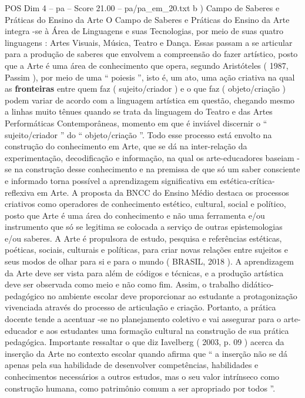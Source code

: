 \begin{textsample}{POS Dim 4 – pa – Score 21.00 – pa/pa\_em\_20.txt}  \label{ex:f4_pos_002}
b ) Campo de Saberes e Práticas do Ensino da Arte O Campo de Saberes e Práticas do Ensino da Arte integra -se à Área de Linguagens e suas Tecnologias, por meio de suas quatro linguagens : Artes Visuais, Música, Teatro e Dança.
Essas passam a se articular para a produção de saberes que envolvem a compreensão do fazer artístico, posto que a Arte é uma área de conhecimento que opera, segundo Aristóteles ( 1987, Passim ), por meio de uma “ poiesis ”, isto é, um ato, uma ação criativa na qual as \textbf{fronteiras} entre quem faz ( sujeito/criador ) e o que faz ( objeto/criação ) podem variar de acordo com a linguagem artística em questão, chegando mesmo a linhas muito tênues quando se trata da linguagem do Teatro e das Artes Performáticas Contemporâneas, momento em que é inviável discernir o “ sujeito/criador ” do “ objeto/criação ”.
Todo esse processo está envolto na construção do conhecimento em Arte, que se dá na inter-relação da experimentação, decodificação e informação, na qual os arte-educadores baseiam -se na construção desse conhecimento e na premissa de que só um saber consciente e informado torna possível a aprendizagem significativa em estética-crítica-reflexiva em Arte.
A proposta da BNCC do Ensino Médio destaca os processos criativos como operadores de conhecimento estético, cultural, social e político, posto que Arte é uma área do conhecimento e não uma ferramenta e/ou instrumento que só se legitima se colocada a serviço de outras epistemologias e/ou saberes.
A Arte é propulsora de estudo, pesquisa e referências estéticas, poéticas, sociais, culturais e políticas, para criar novas relações entre sujeitos e seus modos de olhar para si e para o mundo ( BRASIL, 2018 ).
A aprendizagem da Arte deve ser vista para além de códigos e técnicas, e a produção artística deve ser observada como meio e não como fim.
Assim, o trabalho didático-pedagógico no ambiente escolar deve proporcionar ao estudante a protagonização vivenciada através do processo de articulação e criação.
Portanto, a prática docente tende a acentuar -se no planejamento coletivo e vai assegurar para o arte-educador e aos estudantes uma formação cultural na construção de sua prática pedagógica.
Importante ressaltar o que diz Iavelberg ( 2003, p. 09 ) acerca da inserção da Arte no contexto escolar quando afirma que “ a inserção não se dá apenas pela sua habilidade de desenvolver competências, habilidades e conhecimentos necessários a outros estudos, mas o seu valor intrínseco como construção humana, como patrimônio comum a ser apropriado por todos ”.

\end{textsample}

